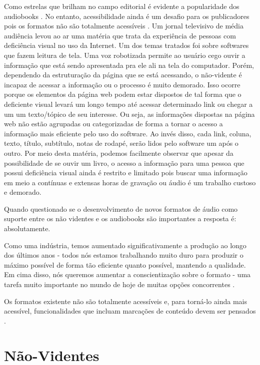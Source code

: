 Como estrelas que brilham no campo editorial é evidente a popularidade dos audiobooks \cite{printdisable}. No entanto, acessibilidade ainda é um desafio para os publicadores pois os formatos não são totalmente acessíveis \cite{challenge}. Um jornal televisivo de média audiência levou ao ar uma matéria que trata da experiência de pessoas com deficiência visual no uso da Internet. Um dos temas tratados foi sobre softwares que fazem leitura de tela. Uma voz robotizada permite ao usuário cego ouvir a informação que está sendo apresentada pra ele ali na tela do computador. Porém, dependendo da estruturação da página que se está acessando, o não-vidente é incapaz de acessar a informação ou o processo é muito demorado. Isso ocorre porque os elementos da página web podem estar dispostos de tal forma que o deficiente visual levará um longo tempo até acessar determinado link ou chegar a um  um texto/tópico de seu interesse. Ou seja, as informações dispostas na página web não estão agrupadas ou categorizadas de forma a tornar o acesso a informação mais eficiente pelo uso do software. Ao invés disso, cada link, coluna, texto, título, subtítulo, notas de rodapé, serão lidos pelo software um após o outro. Por meio desta matéria, podemos facilmente observar que apesar da possibilidade de se ouvir um livro, o acesso a informação para uma pessoa que possui deficiência visual ainda é restrito e limitado pois buscar uma informação em meio a contínuas e extensas horas de gravação ou áudio é um trabalho custoso e demorado.

Quando questionado se o desenvolvimento de novos formatos de áudio como suporte entre os não videntes e os audiobooks são importantes a resposta é: absolutamente.

\begin{citacao}
Como uma indústria, temos aumentado significativamente a produção ao longo dos últimos anos - todos nós estamos trabalhando muito duro para produzir o máximo possível de forma tão eficiente quanto possível, mantendo a qualidade. Em cima disso, nós queremos aumentar a conscientização sobre o formato - uma tarefa muito importante no mundo de hoje de muitas opções concorrentes \cite{multitask}.
\end{citacao}

Os formatos existente não são totalmente acessíveis e, para torná-lo ainda mais acessível, funcionalidades que incluam marcações de conteúdo devem ser pensados \cite{challenge}.

\section{Não-Videntes}

